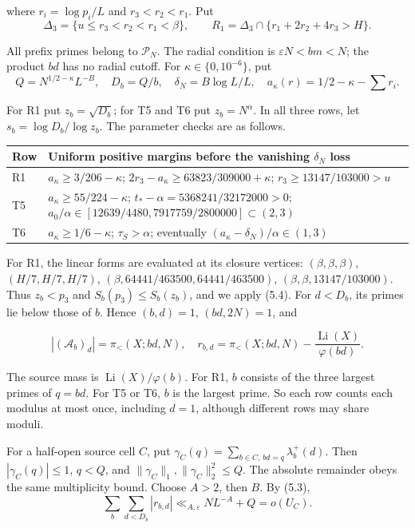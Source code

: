 where $r_i=\log p_i/L$ and $r_3<r_2<r_1$.
Put
\[
 \Delta_3=\{u\le r_3<r_2<r_1<\beta\},\qquad
 R_1=\Delta_3\cap\{r_1+2r_2+4r_3>H\}.
\tag{5.11}
\]

All prefix primes belong to $\mathcal P_N$.
The radial condition is $\varepsilon N<bm<N$;
the product $bd$ has no radial cutoff.
For $\kappa\in\{0,10^{-6}\}$, put
\[
 Q=N^{1/2-\kappa}L^{-B},\quad D_b=Q/b,\quad
 \delta_N=B\log L/L,\quad a_\kappa(r)=1/2-\kappa-\sum r_i.
\tag{5.12}
\]

For R1 put $z_b=\sqrt{D_b}$; for T5 and T6 put $z_b=N^\alpha$.
In all three rows, let $s_b=\log D_b/\log z_b$.
The parameter checks are as follows.
\begin{longtable}{@{}p{}p{}@{}}
\toprule
Row & Uniform positive margins before the vanishing $\delta_N$ loss \\
\midrule
R1 & $a_\kappa\ge3/206-\kappa$; $2r_3-a_\kappa\ge63823/309000+\kappa$; $r_3\ge13147/103000>u$ \\
T5 & $a_\kappa\ge55/224-\kappa$; $t_* -\alpha=5368241/32172000>0$; $a_0/\alpha\in[12639/4480,7917759/2800000]\subset(2,3)$ \\
T6 & $a_\kappa\ge1/6-\kappa$; $\tau_S>\alpha$; eventually $(a_\kappa-\delta_N)/\alpha\in(1,3)$ \\
\bottomrule
\end{longtable}

\begingroup\sloppy
For R1, the linear forms are evaluated at its closure vertices:
$(\beta,\beta,\beta)$,
$(H/7,H/7,H/7)$,
$(\beta,64441/463500,64441/463500)$,
$(\beta,\beta,13147/103000)$.
Thus $z_b<p_3$ and $S_b(p_3)\le S_b(z_b)$, and we apply (5.4).
For $d<D_b$, its primes lie below those of $b$.
Hence $(b,d)=1$, $(bd,2N)=1$, and
\par\endgroup
\[
 |(\mathcal A_b)_d|=\pi_{<}(X;bd,N),\quad
 r_{b,d}=\pi_{<}(X;bd,N)-\frac{\operatorname{Li}(X)}{\varphi(bd)}.
\tag{5.13}
\]

The source mass is $\operatorname{Li}(X)/\varphi(b)$.
For R1, $b$ consists of the three largest primes of $q=bd$.
For T5 or T6, $b$ is the largest prime.
So each row counts each modulus at most once, including $d=1$,
although different rows may share moduli.

For a half-open source cell $C$, put
$\gamma_C(q)=\sum_{b\in C,\,bd=q}\lambda_b^+(d)$.
Then $|\gamma_C(q)|\le1$, $q<Q$, and
$\|\gamma_C\|_1,\|\gamma_C\|_2^2\le Q$.
The absolute remainder obeys the same multiplicity bound.
Choose $A>2$, then $B$. By (5.3),
\[
 \sum_b\sum_{d<D_b}|r_{b,d}|
 \ll_{A,\varepsilon}NL^{-A}+Q=o(U_C).
\tag{5.14}
\]


